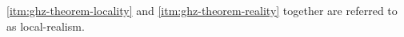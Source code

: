 
\begin{note}%
  \ref{itm:ghz-theorem-locality} and \ref{itm:ghz-theorem-reality} together are referred to as local-realism.
\end{note}
